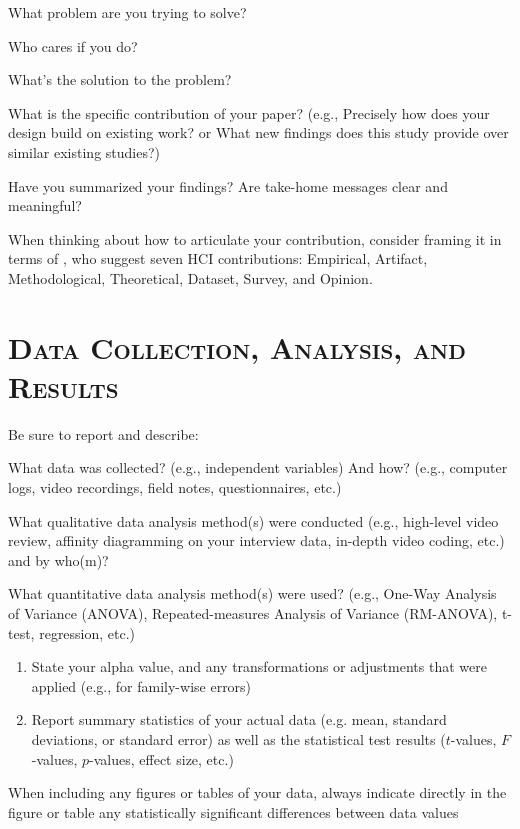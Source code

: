 \begin{checklist}
    \item What problem are you trying to solve?
    \item Who cares if you do? 
    \item What's the solution to the problem? 
	\item What is the specific contribution of your paper? (e.g., Precisely how does your design build on existing work? or What new findings does this study provide over similar existing studies?)
	\item Have you summarized your findings? Are take-home messages clear and meaningful? 
\end{checklist}

When thinking about how to articulate your contribution, consider framing it in terms of \citet{wobbrock2016research}, who suggest seven HCI contributions: Empirical, Artifact, Methodological, Theoretical, Dataset, Survey, and Opinion.

	

\noindent\makebox[\linewidth]{\rule{\linewidth}{0.4pt}}
\section*{\textsc{Data Collection, Analysis, and Results}}

Be sure to report and describe: 
\begin{checklist}
	\item What data was collected? (e.g., independent variables) And how? (e.g., computer logs, video recordings, field notes, questionnaires, etc.) 

	\item What qualitative data analysis method(s) were conducted (e.g., high-level video review, affinity diagramming on your interview data, in-depth video coding, etc.) and by who(m)?
	
	\item What quantitative data analysis method(s) were used? (e.g., One-Way Analysis of Variance (ANOVA), Repeated-measures Analysis of Variance (RM-ANOVA), t-test, regression, etc.) 	
	
	\begin{enumerate}
 		\item State your alpha value, and any transformations or adjustments that were applied (e.g., for family-wise errors)
		\item Report summary statistics of your actual data (e.g. mean, standard deviations, or standard error) as well as the statistical test results ($t$-values, $F$-values, $p$-values, effect size, etc.)
	\end{enumerate}
	\item When including any figures or tables of your data, always indicate directly in the figure or table any statistically significant differences between data values
\end{checklist}


